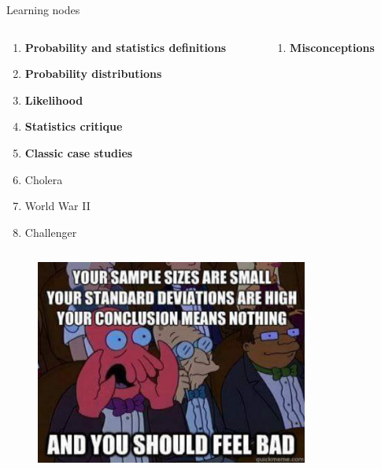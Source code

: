 \documentclass[aspectratio=1610,pdftex,dvipsnames,compress,xcolor={dvipsnames}]{beamer}
\begin{document}
\begin{frame}{Learning nodes}
    \begin{columns}[t]

        \begin{column}{0.50\textwidth}
            \begin{enumerate}[series=outerlist,topsep=0pt,itemsep=1pt,leftmargin=*,label=(\arabic*)]
                \item[]\textbf{Probability and statistics definitions}
                    \vspace{0.10in}
                \item[]\textbf{Probability distributions}
                    \vspace{0.10in}
                \item[]\textbf{Likelihood}
                    \vspace{0.10in}
                \item[]\textbf{Statistics critique}
                    \vspace{0.10in}
                \item[]\textbf{Classic case studies}
                \item[]Cholera
                \item[]World War II
                \item[]Challenger
            \end{enumerate}
        \end{column}

        \begin{column}{0.50\textwidth}
            \begin{enumerate}[series=outerlist,topsep=0pt,itemsep=1pt,leftmargin=*,label=(\arabic*)]
                \item[]\hfill\textbf{Misconceptions}
            \end{enumerate}
        \end{column}

    \end{columns}
\end{frame}


\begin{frame}{}
    \begin{figure}
        \centering
        \includegraphics[width=0.80\textwidth]{zoidberg.jpg}
    \end{figure}
\end{frame}
\end{document}
